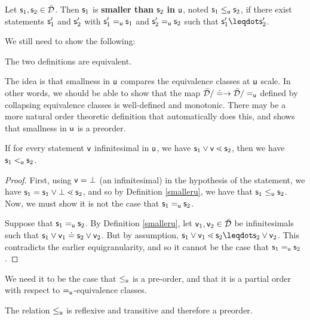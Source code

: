 \documentclass[10pt, onecolumn, longbibliography, nofootinbib]{revtex4-2}
\begin{document}
\begin{defn}\label{smalleru2}
	Let $\stmt_1, \stmt_2 \in \tdomain$. Then $\stmt_1$ is \textbf{smaller than} $\stmt_2$ \textbf{in} $\stmt[u]$, noted $\stmt_1 \lequ \stmt_2$, if there exist statements $\stmt_1'$ and $\stmt_2'$ with $\stmt_1'\equ\stmt_1$ and $\stmt_2'\equ\stmt_2$ such that $\stmt_1'\finer\stmt_2'$.
\end{defn}

We still need to show the following:

\begin{desid}
	The two definitions are equivalent.
\end{desid}

\begin{remark}
	The idea is that smallness in $\stmt[u]$ compares the equivalence classes at $\stmt[u]$ scale. In other words, we should be able to show that the map $\tdomain / \eqgran \to \tdomain / \equ$ defined by collapsing equivalence classes is well-defined and monotonic. There may be a more natural order theoretic definition that automatically does this, and shows that smallness in $\stmt[u]$ is a preorder.
\end{remark}


\begin{prop}
	If for every statement $\stmt[v]$ infinitesimal in $\stmt[u]$, we have $\stmt_1\OR\stmt[v] \sfiner \stmt_2$, then we have $\stmt_1 \leu \stmt_2$. 
\end{prop}
\begin{proof}
	First, using $\stmt[v] = \impossibility$ (an infinitesimal) in the hypothesis of the statement, we have $\stmt_1 = \stmt_1\OR\impossibility \sfiner \stmt_2$, and so by Definition \ref{smalleru}, we have that $\stmt_1\lequ\stmt_2$. Now, we must show it is not the case that $\stmt_1\equ \stmt_2$. 
	
	Suppose that $\stmt_1 \equ \stmt_2$. By Definition \ref{smalleru}, let $\stmt[v]_1,\stmt[v]_2\in\tdomain$ be infinitesimals such that $\stmt_1 \OR \stmt[v]_1 \eqgran \stmt_2 \OR \stmt[v]_2$. But by assumption, $\stmt_1\OR\stmt[v]_1 \sfiner \stmt_2 \finer\stmt_2\OR\stmt[v]_2$. This contradicts the earlier equigranularity, and so it cannot be the case that $\stmt_1\equ\stmt_2$. 
\end{proof}

We need it to be the case that $\lequ$ is a pre-order, and that it is a partial order with respect to $\equ$-equivalence classes. 

\begin{conj}
	The relation $\lequ$ is reflexive and transitive and therefore a preorder.
\end{conj}
\end{document}
